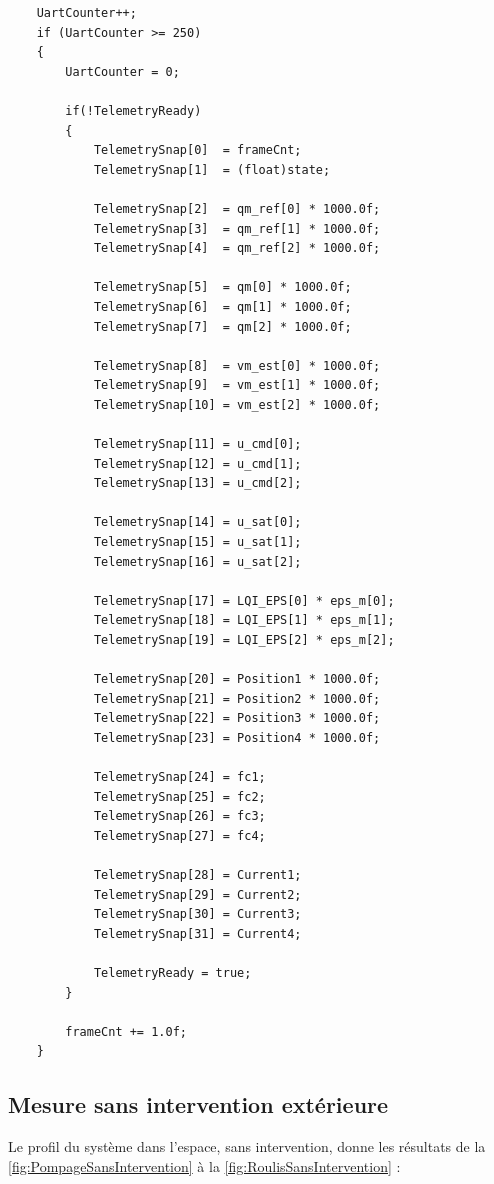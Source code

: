 \begin{verbatim}
    UartCounter++;
    if (UartCounter >= 250)
    {
        UartCounter = 0;

        if(!TelemetryReady)
        {
            TelemetrySnap[0]  = frameCnt;
            TelemetrySnap[1]  = (float)state;

            TelemetrySnap[2]  = qm_ref[0] * 1000.0f;
            TelemetrySnap[3]  = qm_ref[1] * 1000.0f;
            TelemetrySnap[4]  = qm_ref[2] * 1000.0f;

            TelemetrySnap[5]  = qm[0] * 1000.0f;
            TelemetrySnap[6]  = qm[1] * 1000.0f;
            TelemetrySnap[7]  = qm[2] * 1000.0f;

            TelemetrySnap[8]  = vm_est[0] * 1000.0f;
            TelemetrySnap[9]  = vm_est[1] * 1000.0f;
            TelemetrySnap[10] = vm_est[2] * 1000.0f;

            TelemetrySnap[11] = u_cmd[0];
            TelemetrySnap[12] = u_cmd[1];
            TelemetrySnap[13] = u_cmd[2];

            TelemetrySnap[14] = u_sat[0];
            TelemetrySnap[15] = u_sat[1];
            TelemetrySnap[16] = u_sat[2];

            TelemetrySnap[17] = LQI_EPS[0] * eps_m[0];
            TelemetrySnap[18] = LQI_EPS[1] * eps_m[1];
            TelemetrySnap[19] = LQI_EPS[2] * eps_m[2];

            TelemetrySnap[20] = Position1 * 1000.0f;
            TelemetrySnap[21] = Position2 * 1000.0f;
            TelemetrySnap[22] = Position3 * 1000.0f;
            TelemetrySnap[23] = Position4 * 1000.0f;

            TelemetrySnap[24] = fc1;
            TelemetrySnap[25] = fc2;
            TelemetrySnap[26] = fc3;
            TelemetrySnap[27] = fc4;

            TelemetrySnap[28] = Current1;
            TelemetrySnap[29] = Current2;
            TelemetrySnap[30] = Current3;
            TelemetrySnap[31] = Current4;

            TelemetryReady = true;
        }

        frameCnt += 1.0f;
    }
\end{verbatim}

\subsection{Mesure sans intervention extérieure}
Le profil du système dans l'espace, sans intervention, donne les résultats de la \autoref{fig:PompageSansIntervention} à la \autoref{fig:RoulisSansIntervention} :

